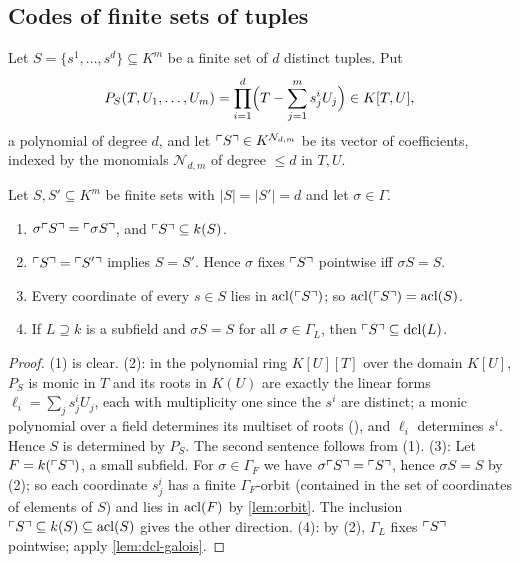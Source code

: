 \subsection{Codes of finite sets of tuples}

\begin{definition}\label{def:code}
Let $S=\{s^{1},\dots,s^{d}\}\subseteq K^m$ be a finite set of $d$ distinct tuples.
Put
\[
  P_S(T,U_1,\dots,U_m)=\prod_{i=1}^{d}\Bigl(T-\sum_{j=1}^{m}s^{i}_jU_j\Bigr)\in K[T,U],
\]
a polynomial of degree $d$, and let $\ulcorner S\urcorner\in K^{\mathcal N_{d,m}}$ be its vector of
coefficients, indexed by the monomials $\mathcal N_{d,m}$ of degree $\le d$ in $T,U$.
\end{definition}

\begin{lemma}\label{lem:code}
Let $S,S'\subseteq K^m$ be finite sets with $|S|=|S'|=d$ and let $\sigma\in\Gamma$.
\begin{enumerate}[nosep]
\item $\sigma\ulcorner S\urcorner=\ulcorner \sigma S\urcorner$, and $\ulcorner S\urcorner\subseteq k(S)$.
\item $\ulcorner S\urcorner=\ulcorner S'\urcorner$ implies $S=S'$.  Hence $\sigma$ fixes $\ulcorner S\urcorner$ pointwise
  iff $\sigma S=S$.
\item Every coordinate of every $s\in S$ lies in $\operatorname{acl}(\ulcorner S\urcorner)$; so
  $\operatorname{acl}(\ulcorner S\urcorner)=\operatorname{acl}(S)$.
\item If $L\supseteq k$ is a subfield and $\sigma S=S$ for all $\sigma\in\Gamma_L$, then
  $\ulcorner S\urcorner\subseteq\operatorname{dcl}(L)$.
\end{enumerate}
\end{lemma}
\begin{proof}
(1) is clear.  (2): in the polynomial ring $K[U][T]$ over the domain $K[U]$, $P_S$ is
monic in $T$ and its roots in $K(U)$ are exactly the linear forms
$\ell_i=\sum_j s^i_jU_j$, each with multiplicity one since the $s^i$ are distinct; a
monic polynomial over a field determines its multiset of roots
(), and $\ell_i$ determines $s^i$.  Hence $S$ is determined by
$P_S$.  The second sentence follows from (1).  (3): Let $F=k(\ulcorner S\urcorner)$, a small
subfield.  For $\sigma\in\Gamma_F$ we have $\sigma\ulcorner S\urcorner=\ulcorner S\urcorner$, hence $\sigma S=S$
by (2); so each coordinate $s^i_j$ has a finite $\Gamma_F$-orbit (contained in the set
of coordinates of elements of $S$) and lies in $\operatorname{acl}(F)$ by \cref{lem:orbit}.  The
inclusion $\ulcorner S\urcorner\subseteq k(S)\subseteq\operatorname{acl}(S)$ gives the other direction.
(4): by (2), $\Gamma_L$ fixes $\ulcorner S\urcorner$ pointwise; apply \cref{lem:dcl-galois}.
\end{proof}

